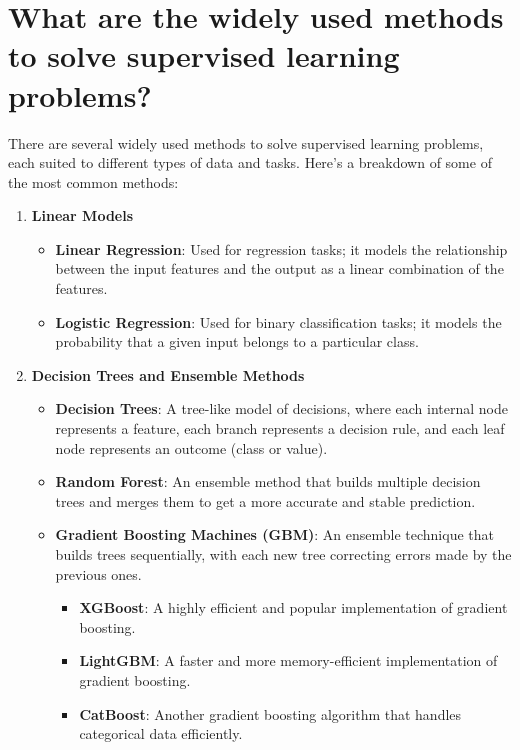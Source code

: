\documentclass{article}
\begin{document}
\section{What are the widely used methods to solve supervised learning problems?}
There are several widely used methods to solve supervised learning problems, each suited to different types of data and tasks. Here’s a breakdown of some of the most common methods:

\begin{enumerate}
    \item \textbf{Linear Models}
    \begin{itemize}
        \item \textbf{Linear Regression}: Used for regression tasks; it models the relationship between the input features and the output as a linear combination of the features.
        \item \textbf{Logistic Regression}: Used for binary classification tasks; it models the probability that a given input belongs to a particular class.
    \end{itemize}
    
    \item \textbf{Decision Trees and Ensemble Methods}
    \begin{itemize}
        \item \textbf{Decision Trees}: A tree-like model of decisions, where each internal node represents a feature, each branch represents a decision rule, and each leaf node represents an outcome (class or value).
        \item \textbf{Random Forest}: An ensemble method that builds multiple decision trees and merges them to get a more accurate and stable prediction.
        \item \textbf{Gradient Boosting Machines (GBM)}: An ensemble technique that builds trees sequentially, with each new tree correcting errors made by the previous ones.
        \begin{itemize}
            \item \textbf{XGBoost}: A highly efficient and popular implementation of gradient boosting.
            \item \textbf{LightGBM}: A faster and more memory-efficient implementation of gradient boosting.
            \item \textbf{CatBoost}: Another gradient boosting algorithm that handles categorical data efficiently.
        \end{itemize}
    \end{itemize}


\end{enumerate}
\end{document}
